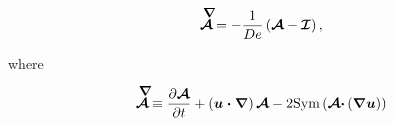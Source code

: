 \documentclass[]{article}
\begin{document}
\begin{enumerate}
\begin{enumerate}
\begin{itemize}
        \begin{align}
            \label{Aupperconv}
            \stackrel{\smash{\raisebox{0ex}{$\mkern8mu\boldsymbol{\nabla}$}}}{\boldsymbol{\mathcal{A}}}  =  - \frac{1}{De} \left( \boldsymbol{\mathcal{A}} - \boldsymbol{\mathcal{I}}  \right),
        \end{align}

        \noindent where

        \begin{align}
            \label{Aupper_def}
            \stackrel{\smash{\raisebox{0ex}{$\mkern8mu\boldsymbol{\nabla}$}}}{\boldsymbol{\mathcal{A}}} \equiv \frac{\partial\boldsymbol{\mathcal{A}}}{\partial t} + \left(\boldsymbol{u\cdot\nabla}\right)\boldsymbol{\mathcal{A}} - 2\text{Sym}\left(\boldsymbol{\mathcal{A}\cdot}\left(\boldsymbol{\nabla u}\right)\right)
        \end{align}


\end{itemize}
\end{enumerate}
\end{enumerate}
\end{document}
